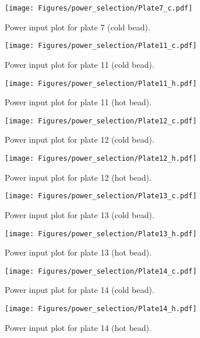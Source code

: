 \begin{figure}[htp]
   \centering
   \texttt{[image: Figures/power\_selection/Plate7\_c.pdf]}
   \caption{Power input plot for plate 7 (cold bead). }
\end{figure}


\begin{figure}[htp]
   \centering
   \texttt{[image: Figures/power\_selection/Plate11\_c.pdf]}
   \caption{Power input plot for plate 11 (cold bead). }
\end{figure}


\begin{figure}[htp]
   \centering
   \texttt{[image: Figures/power\_selection/Plate11\_h.pdf]}
   \caption{Power input plot for plate 11 (hot bead). }
\end{figure}


\begin{figure}[htp]
   \centering
   \texttt{[image: Figures/power\_selection/Plate12\_c.pdf]}
   \caption{Power input plot for plate 12 (cold bead). }
\end{figure}


\begin{figure}[htp]
   \centering
   \texttt{[image: Figures/power\_selection/Plate12\_h.pdf]}
   \caption{Power input plot for plate 12 (hot bead). }
\end{figure}


\begin{figure}[htp]
   \centering
   \texttt{[image: Figures/power\_selection/Plate13\_c.pdf]}
   \caption{Power input plot for plate 13 (cold bead). }
\end{figure}


\begin{figure}[htp]
   \centering
   \texttt{[image: Figures/power\_selection/Plate13\_h.pdf]}
   \caption{Power input plot for plate 13 (hot bead). }
\end{figure}


\begin{figure}[htp]
   \centering
   \texttt{[image: Figures/power\_selection/Plate14\_c.pdf]}
   \caption{Power input plot for plate 14 (cold bead). }
\end{figure}


\begin{figure}[htp]
   \centering
   \texttt{[image: Figures/power\_selection/Plate14\_h.pdf]}
   \caption{Power input plot for plate 14 (hot bead). }
\end{figure}


